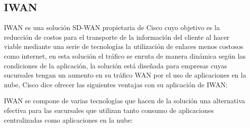 \subsection{IWAN}
\label{sec:IWAN}

IWAN es una solución SD-WAN propietaria de Cisco cuyo objetivo es la reducción de costos para el transporte de la información del cliente al hacer viable mediante una serie de tecnologías la utilización de enlaces menos costosos como internet, en esta solución el tráfico se enruta de manera dinámica según las condiciones de la aplicación, la solución está diseñada para empresas cuyas sucursales tengan un aumento en su tráfico WAN por el uso de aplicaciones en la nube, Cisco dice ofrecer las siguientes ventajas con su aplicación de IWAN:



IWAN se compone de varias tecnologías que hacen de la solución una alternativa efectiva para las sucursales que utilizan tanto consumo de aplicaciones centralizadas como aplicaciones en la nube:


